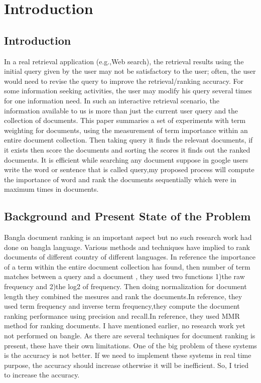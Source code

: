 \chapter{Introduction}
\label{Ch_Chapter1}

\section{Introduction}

In a real retrieval application (e.g.,Web search), the retrieval results using the initial query given by the user may not be satisfactory to the user; often, the user would need to revise the query to improve the retrieval/ranking accuracy. For some information seeking activities, the user may modify his query several times for one information need. In such an interactive retrieval scenario, the information available to us is more than just the current user query and the collection of documents. This paper summaries a set of experiments with term weighting for documents, using the measurement of term importance within an entire document collection. Then taking query it finds the relevant   documents, if it exists then score the documents and sorting the scores it finds out the ranked documents. It is efficient while searching any document suppose in google users write the word or sentence that is called query,my proposed  process will compute the importance of  word and rank the documents sequentially which were in maximum times in documents.

\section{Background and Present State of the Problem}

Bangla document ranking is an important aspect but no such research work had done on bangla language. Various methods and techniques have implied to rank documents of different country of different languages. In reference the importance of a term within the entire document collection has found, then number of term matches between a query and a document , they used two functions 1)the raw frequency and 2)the  log2  of frequency. Then doing normalization for document length they combined the mesures and rank the documents.In reference, they used term frequency and inverse term frequency,they compute the document ranking  performance using precision and recall.In reference, they used MMR method for  ranking documents.
I have mentioned earlier, no research work yet not performed on bangle.  As there are several techniques for document ranking is present, these have their own limitations. One of the big problem of these systems is the accuracy is 	not better. If we need to implement these systems in real time purpose, the accuracy should increase otherwise it will be inefficient. So, I tried to increase the accuracy.

